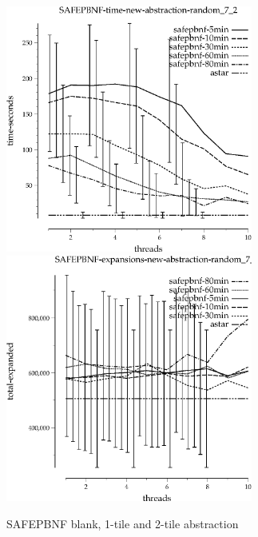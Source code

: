 \documentclass{article}
\begin{document}
\begin{figure}
\begin{center}
\includegraphics[width=3.2in]{tiles_random_7_2/SAFEPBNF-time-new-abstraction-random_7_2}
\includegraphics[width=3.2in]{tiles_random_7_2/SAFEPBNF-expansions-new-abstraction-random_7_2}
\end{center}
\caption{SAFEPBNF blank, 1-tile and 2-tile abstraction}
\end{figure}
\end{document}
